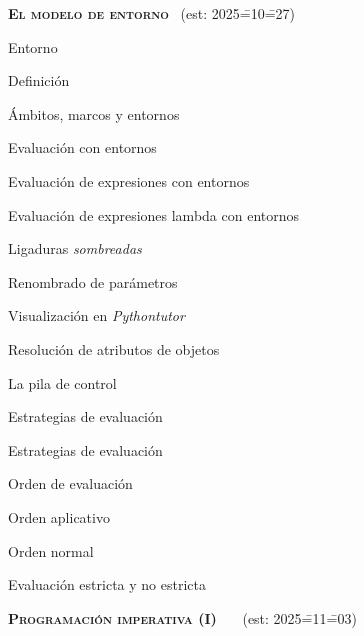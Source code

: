 \begin{longenum}
\begin{longenum}
\begin{longenum}
        \end{longenum}
    \end{longenum}
    \item \textbf{\textsc{El modelo de entorno}} \ (est: 2025\==10\==27)
    \begin{longenum}
        \item Entorno
        \begin{longenum}
            \item Definición
            \item Ámbitos, marcos y entornos
        \end{longenum}
        \item Evaluación con entornos
        \begin{longenum}
            \item Evaluación de expresiones con entornos
            \item Evaluación de expresiones lambda con entornos
            \begin{longenum}
                \item Ligaduras \textit{sombreadas}
                \item Renombrado de parámetros
                \item Visualización en \textit{Pythontutor}
            \end{longenum}
            \item Resolución de atributos de objetos
        \end{longenum}
        \item La pila de control
        \item Estrategias de evaluación \opcional\
        \begin{longenum}
            \item Estrategias de evaluación
            \item Orden de evaluación
            \begin{longenum}
                \item Orden aplicativo
                \item Orden normal
            \end{longenum}
            \item Evaluación estricta y no estricta
        \end{longenum}
    \end{longenum}
    \item \textbf{\textsc{Programación imperativa (I)}} \ce{1e}\ \ev1\ \ra1\ (est: 2025\==11\==03)
    \begin{longenum}

\end{longenum}
\end{longenum}
